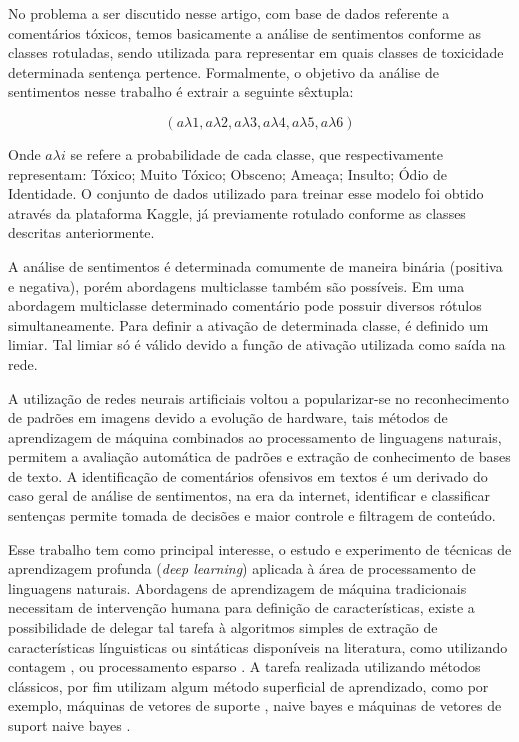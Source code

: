 \documentclass[12pt]{article}
\begin{document}
No problema a ser discutido nesse artigo, com base de dados referente a comentários tóxicos, temos basicamente a análise de sentimentos conforme as classes rotuladas, sendo utilizada para representar em quais classes de toxicidade determinada sentença pertence. Formalmente, o objetivo da análise de sentimentos nesse trabalho é extrair a seguinte sêxtupla:

\[
(a\lambda1, a\lambda2, a\lambda3, a\lambda4, a\lambda5, a\lambda6)
\]

Onde $a \lambda i$ se refere a probabilidade de cada classe, que respectivamente representam: Tóxico; Muito Tóxico; Obsceno; Ameaça; Insulto; Ódio de Identidade. O conjunto de dados utilizado para treinar esse modelo foi obtido através da plataforma Kaggle, já previamente rotulado conforme as classes descritas anteriormente.

A análise de sentimentos é determinada comumente de maneira binária (positiva e negativa), porém abordagens multiclasse também são possíveis. Em uma abordagem multiclasse determinado comentário pode possuir diversos rótulos simultaneamente. Para definir a ativação de determinada classe, é definido um limiar. Tal limiar só é válido devido a função de ativação utilizada como saída na rede.

A utilização de redes neurais artificiais voltou a popularizar-se no reconhecimento de padrões em imagens devido a evolução de hardware, tais métodos de aprendizagem de máquina combinados ao processamento de linguagens naturais, permitem a avaliação automática de padrões e extração de conhecimento de bases de texto. A identificação de comentários ofensivos em textos é um derivado do caso geral de análise de sentimentos, na era da internet, identificar e classificar sentenças permite tomada de decisões e maior controle e filtragem de conteúdo. 

Esse trabalho tem como principal interesse, o estudo e experimento de técnicas de aprendizagem profunda (\textit{deep learning}) aplicada à área de processamento de linguagens naturais. Abordagens de aprendizagem de máquina tradicionais necessitam de intervenção humana para definição de características, existe a possibilidade de delegar tal tarefa à algoritmos simples de extração de características línguisticas ou sintáticas disponíveis na literatura, como utilizando contagem \cite{DBLP:journals/corr/abs-1805-04871}, ou processamento esparso \cite{ramos2003using}. A tarefa realizada utilizando métodos clássicos, por fim utilizam algum método superficial de aprendizado, como por exemplo, máquinas de vetores de suporte \cite{DBLP:journals/ml/CortesV95}, naive bayes e máquinas de vetores de suport naive bayes  \cite{wang:2012}.
\end{document}
